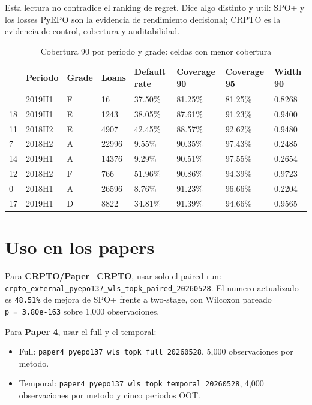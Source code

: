 \documentclass[
  spanish,
  11pt,
  letterpaper,
]{scrbook}
\providecommand{\tightlist}{%
  \setlength{\itemsep}{0pt}\setlength{\parskip}{0pt}}
\theoremstyle{plain}
\theoremstyle{remark}
\begin{document}
Esta lectura no contradice el ranking de regret. Dice algo distinto y
util: SPO+ y los losses PyEPO son la evidencia de rendimiento
decisional; CRPTO es la evidencia de control, cobertura y auditabilidad.

{

\begin{longtable}[]{@{}llllllll@{}}

\caption{\label{tbl-p4-pyepo-coverage-grade-tail}Cobertura 90 por
periodo y grade: celdas con menor cobertura}

\tabularnewline

\toprule\noalign{}
& Periodo & Grade & Loans & Default rate & Coverage 90 & Coverage 95 &
Width 90 \\
\midrule\noalign{}
\endhead
\bottomrule\noalign{}
\endlastfoot
19 & 2019H1 & F & 16 & 37.50\% & 81.25\% & 81.25\% & 0.8268 \\
18 & 2019H1 & E & 1243 & 38.05\% & 87.61\% & 91.23\% & 0.9400 \\
11 & 2018H2 & E & 4907 & 42.45\% & 88.57\% & 92.62\% & 0.9480 \\
7 & 2018H2 & A & 22996 & 9.55\% & 90.35\% & 97.43\% & 0.2485 \\
14 & 2019H1 & A & 14376 & 9.29\% & 90.51\% & 97.55\% & 0.2654 \\
12 & 2018H2 & F & 766 & 51.96\% & 90.86\% & 94.39\% & 0.9723 \\
0 & 2018H1 & A & 26596 & 8.76\% & 91.23\% & 96.66\% & 0.2204 \\
17 & 2019H1 & D & 8822 & 34.81\% & 91.39\% & 94.66\% & 0.9565 \\

\end{longtable}

}

\section{Uso en los papers}\label{uso-en-los-papers}

Para \textbf{CRPTO/Paper\_CRPTO}, usar solo el paired run:
\texttt{crpto\_external\_pyepo137\_wls\_topk\_paired\_20260528}. El
numero actualizado es \texttt{48.51\%} de mejora de SPO+ frente a
two-stage, con Wilcoxon pareado \texttt{p\ =\ 3.80e-163} sobre 1,000
observaciones.

Para \textbf{Paper 4}, usar el full y el temporal:

\begin{itemize}
\tightlist
\item
  Full: \texttt{paper4\_pyepo137\_wls\_topk\_full\_20260528}, 5,000
  observaciones por metodo.
\item
  Temporal: \texttt{paper4\_pyepo137\_wls\_topk\_temporal\_20260528},
  4,000 observaciones por metodo y cinco periodos OOT.
\end{itemize}
\end{document}
